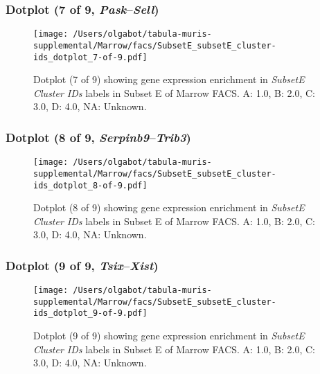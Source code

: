 \clearpage

\subsubsection{Dotplot (7 of 9, \emph{Pask}--\emph{Sell})}
\begin{figure}[h]
\centering
\texttt{[image: /Users/olgabot/tabula-muris-supplemental/Marrow/facs/SubsetE\_subsetE\_cluster-ids\_dotplot\_7-of-9.pdf]}

\caption{ Dotplot (7 of 9)  showing gene expression enrichment in \emph{SubsetE Cluster IDs} labels in Subset E of Marrow FACS. A: 1.0, B: 2.0, C: 3.0, D: 4.0, NA: Unknown.}
\end{figure}


\clearpage

\subsubsection{Dotplot (8 of 9, \emph{Serpinb9}--\emph{Trib3})}
\begin{figure}[h]
\centering
\texttt{[image: /Users/olgabot/tabula-muris-supplemental/Marrow/facs/SubsetE\_subsetE\_cluster-ids\_dotplot\_8-of-9.pdf]}

\caption{ Dotplot (8 of 9)  showing gene expression enrichment in \emph{SubsetE Cluster IDs} labels in Subset E of Marrow FACS. A: 1.0, B: 2.0, C: 3.0, D: 4.0, NA: Unknown.}
\end{figure}


\clearpage

\subsubsection{Dotplot (9 of 9, \emph{Tsix}--\emph{Xist})}
\begin{figure}[h]
\centering
\texttt{[image: /Users/olgabot/tabula-muris-supplemental/Marrow/facs/SubsetE\_subsetE\_cluster-ids\_dotplot\_9-of-9.pdf]}

\caption{ Dotplot (9 of 9)  showing gene expression enrichment in \emph{SubsetE Cluster IDs} labels in Subset E of Marrow FACS. A: 1.0, B: 2.0, C: 3.0, D: 4.0, NA: Unknown.}
\end{figure}

